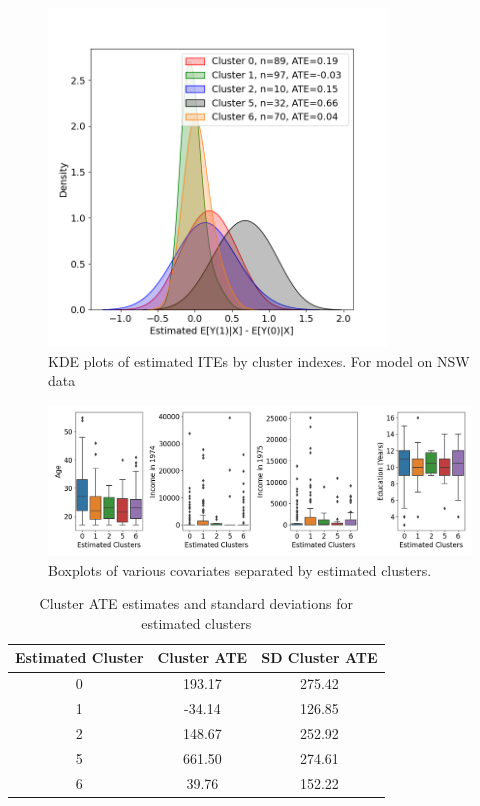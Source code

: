 \documentclass{article}
\begin{document}
\begin{appendices}
\begin{figure}[h]
  \centering
  \includegraphics[width=0.8\textwidth]{Plots/NSW_output_histogram.png}
  \caption{KDE plots of estimated ITEs by cluster indexes. For model on NSW data}
  \label{fig:nsw_histo}
\end{figure}

\begin{figure}[h]
  \centering
  \includegraphics[width=1\textwidth]{Plots/nsw_demo_clusters.png}
  \caption{Boxplots of various covariates separated by estimated clusters.}
  \label{fig:nsw_boxplots}
\end{figure}

\begin{table}[H]
\centering
\label{tab:cluster_ate}
\begin{tabular}{c|c c}
\hline
\textbf{Estimated Cluster} & \textbf{Cluster ATE} & \textbf{SD Cluster ATE} \\ \hline
0 & 193.17 & 275.42 \\
1 & -34.14 & 126.85 \\
2 & 148.67 & 252.92 \\
5 & 661.50 & 274.61 \\
6 & 39.76 & 152.22 \\
\hline
\end{tabular}
\caption{Cluster ATE estimates and standard deviations for estimated clusters}
\label{tab:nsw_ate_results}
\end{table}



\end{appendices}
\end{document}
